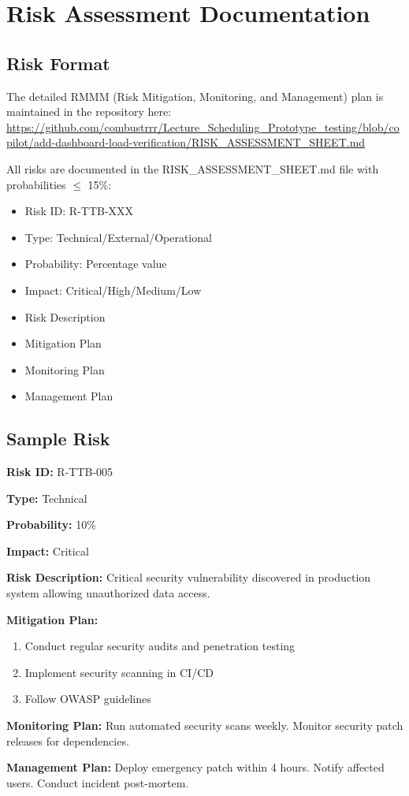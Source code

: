\chapter{Risk Assessment Documentation}

\section{Risk Format}
The detailed RMMM (Risk Mitigation, Monitoring, and Management) plan is maintained in the repository here:
\\\url{https://github.com/combustrrr/Lecture_Scheduling_Prototype_testing/blob/copilot/add-dashboard-load-verification/RISK_ASSESSMENT_SHEET.md}

All risks are documented in the RISK\_ASSESSMENT\_SHEET.md file with probabilities $\leq$ 15\%:
\begin{itemize}[leftmargin=*]
    \item Risk ID: R-TTB-XXX
    \item Type: Technical/External/Operational
    \item Probability: Percentage value
    \item Impact: Critical/High/Medium/Low
    \item Risk Description
    \item Mitigation Plan
    \item Monitoring Plan
    \item Management Plan
\end{itemize}

\section{Sample Risk}
\textbf{Risk ID:} R-TTB-005

\textbf{Type:} Technical

\textbf{Probability:} 10\%

\textbf{Impact:} Critical

\textbf{Risk Description:} Critical security vulnerability discovered in production system allowing unauthorized data access.

\textbf{Mitigation Plan:}
\begin{enumerate}
    \item Conduct regular security audits and penetration testing
    \item Implement security scanning in CI/CD
    \item Follow OWASP guidelines
\end{enumerate}

\textbf{Monitoring Plan:} Run automated security scans weekly. Monitor security patch releases for dependencies.

\textbf{Management Plan:} Deploy emergency patch within 4 hours. Notify affected users. Conduct incident post-mortem.
